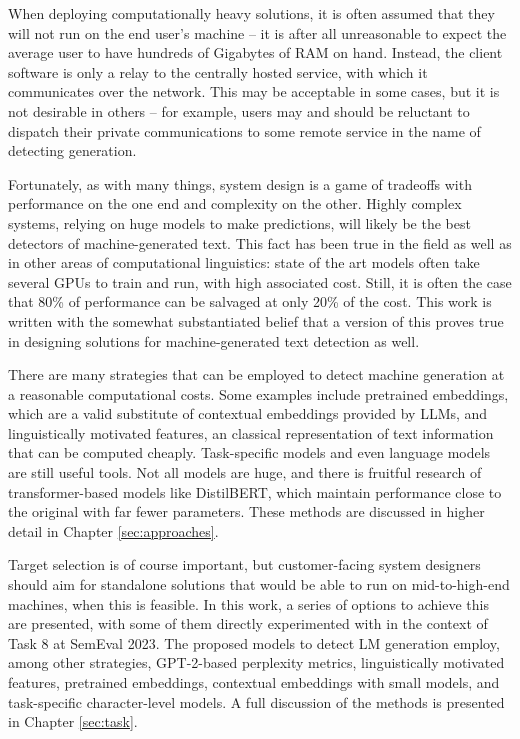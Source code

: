 When deploying computationally heavy solutions, it is often assumed that they will not run on the end user's machine -- it is after all unreasonable to expect the average user to have hundreds of Gigabytes of RAM on hand.
Instead, the client software is only a relay to the centrally hosted service, with which it communicates over the network.
This may be acceptable in some cases, but it is not desirable in others -- for example, users may and should be reluctant to dispatch their private communications to some remote service in the name of detecting generation.

Fortunately, as with many things, system design is a game of tradeoffs with performance on the one end and complexity on the other.
Highly complex systems, relying on huge models to make predictions, will likely be the best detectors of machine-generated text.
This fact has been true in the field as well as in other areas of computational linguistics: state of the art models often take several GPUs to train and run, with high associated cost.
Still, it is often the case that 80\% of performance can be salvaged at only 20\% of the cost.
This work is written with the somewhat substantiated belief that a version of this proves true in designing solutions for machine-generated text detection as well.

There are many strategies that can be employed to detect machine generation at a reasonable computational costs.
Some examples include pretrained embeddings, which are a valid substitute of contextual embeddings provided by LLMs, and linguistically motivated features, an classical representation of text information that can be computed cheaply.
Task-specific models and even language models are still useful tools.
Not all models are huge, and there is fruitful research of transformer-based models like DistilBERT, which maintain performance close to the original with far fewer parameters.
These methods are discussed in higher detail in Chapter \ref{sec:approaches}.

Target selection is of course important, but customer-facing system designers should aim for standalone solutions that would be able to run on mid-to-high-end machines, when this is feasible.
In this work, a series of options to achieve this are presented, with some of them directly experimented with in the context of Task 8 at SemEval 2023.
The proposed models to detect LM generation employ, among other strategies, GPT-2-based perplexity metrics, linguistically motivated features, pretrained embeddings, contextual embeddings with small models, and task-specific character-level models.
A full discussion of the methods is presented in Chapter \ref{sec:task}.
